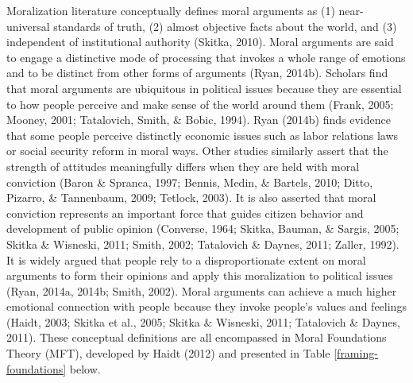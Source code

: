 \documentclass[12pt,econ]{sources/authesis}
\makeatletter
\def\caption{\refstepcounter\@captype \@dblarg{\@caption\@captype}}
\makeatother
\begin{document}
Moralization literature conceptually defines moral arguments as (1) near-universal standards of truth, (2) almost objective facts about the world, and (3) independent of institutional authority (Skitka, 2010). Moral arguments are said to engage a distinctive mode of processing that invokes a whole range of emotions and to be distinct from other forms of arguments (Ryan, 2014b). Scholars find that moral arguments are ubiquitous in political issues because they are essential to how people perceive and make sense of the world around them (Frank, 2005; Mooney, 2001; Tatalovich, Smith, \& Bobic, 1994). Ryan (2014b) finds evidence that some people perceive distinctly economic issues such as labor relations laws or social security reform in moral ways. Other studies similarly assert that the strength of attitudes meaningfully differs when they are held with moral conviction (Baron \& Spranca, 1997; Bennis, Medin, \& Bartels, 2010; Ditto, Pizarro, \& Tannenbaum, 2009; Tetlock, 2003). It is also asserted that moral conviction represents an important force that guides citizen behavior and development of public opinion (Converse, 1964; Skitka, Bauman, \& Sargis, 2005; Skitka \& Wisneski, 2011; Smith, 2002; Tatalovich \& Daynes, 2011; Zaller, 1992). It is widely argued that people rely to a disproportionate extent on moral arguments to form their opinions and apply this moralization to political issues (Ryan, 2014a, 2014b; Smith, 2002). Moral arguments can achieve a much higher emotional connection with people because they invoke people's values and feelings (Haidt, 2003; Skitka et al., 2005; Skitka \& Wisneski, 2011; Tatalovich \& Daynes, 2011). These conceptual definitions are all encompassed in Moral Foundations Theory (MFT), developed by Haidt (2012) and presented in Table \ref{framing-foundations} below.
\begin{table}[ht]
\caption{Foundations of Moral Arguments}
\centering
{}
\label{framing-foundations}
\end{table}
\end{document}

